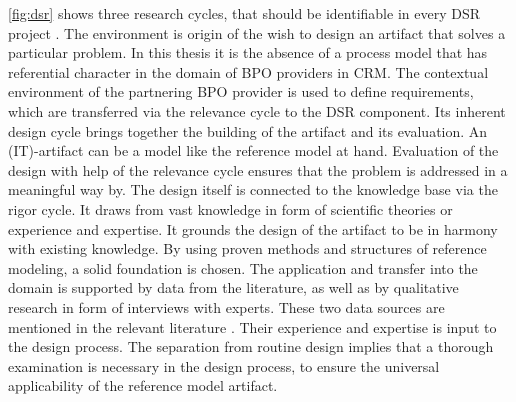 \Fig \ref{fig:dsr} shows three research cycles, that should be identifiable in every \acrshort{DSR} project \citep{Hevner2010}. The environment is origin of the wish to design an artifact that solves a particular problem. In this thesis it is the absence of a process model that has referential character in the domain of \acrshort{BPO} providers in \acrshort{CRM}. The contextual environment of the partnering  \acrshort{BPO} provider is used to define requirements, which are transferred via the relevance cycle to the \acrshort{DSR} component. Its inherent design cycle brings together the building of the artifact and its evaluation. An (IT)-artifact can be a model \citep{Hevner2010} like the reference model at hand. Evaluation of the design with help of the relevance cycle ensures that the problem is addressed in a meaningful way by. The design itself is connected to the knowledge base via the rigor cycle. It draws from vast knowledge in form of scientific theories or experience and expertise. It grounds the design of the artifact to be in harmony with existing knowledge. By using proven methods and structures of reference modeling, a solid foundation is chosen. The application and transfer into the domain is supported by data from the literature, as well as by qualitative research in form of interviews with experts. These two data sources are mentioned in the relevant literature \citep[]{thomas2006mang}. Their experience and expertise is input to the design process. The separation from routine design implies that a thorough examination is necessary in the design process, to ensure the universal applicability of the reference model artifact. 





